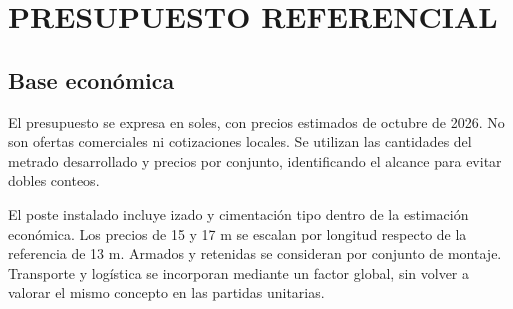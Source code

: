 \chapter{PRESUPUESTO REFERENCIAL}
\section{Base económica}
El presupuesto se expresa en soles, con precios estimados de octubre de 2026. No son ofertas comerciales ni cotizaciones locales. Se utilizan las cantidades del metrado desarrollado y precios por conjunto, identificando el alcance para evitar dobles conteos.

El poste instalado incluye izado y cimentación tipo dentro de la estimación económica. Los precios de 15 y 17 m se escalan por longitud respecto de la referencia de 13 m. Armados y retenidas se consideran por conjunto de montaje. Transporte y logística se incorporan mediante un factor global, sin volver a valorar el mismo concepto en las partidas unitarias.

